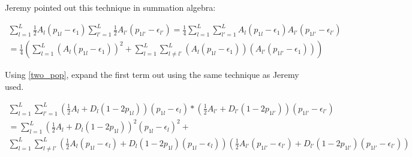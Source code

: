 \documentclass[a4paper,10pt]{article}
\begin{document}
\begin{comment}
    Let's step back from worrying about variances and covariances for
    a minute (I think I was trying to have you solve too many steps at
    once by suggesting to focus on that interpretation). See if you
    can see your way to verifying my intuition about the above
    expressions. The stuff you have written in lines
    \eqref{big-expansion} seems very close to what we're looking for,
    but 1) I think you may be missing some addition signs in between
    the two different sums on each line (but I'm not certain, as I had
    a little trouble following exactly how you arrived at these
    expressions), and 2) I don't totally follow your indexing, as for
    each case you say that $l$ goes from $l'$ to $L$ but at no point
    is it specified what $l'$ is, so that seems like it can't be quite
    right.

  \end{comment}

  Jeremy pointed out this technique in summation algebra: 
  
  \begin{align}
  \sum^L_{l=1}\frac{1}{2}A_l(p_{1l}-\epsilon_{1}) \sum^L_{l'=1}\frac{1}{2}A_{l'}(p_{1l'}-\epsilon_{l'}) =   \frac{1}{4}\sum^L_{l=1}\sum^L_{l'=1}A_l(p_{1l}-\epsilon_{1})A_{l'}(p_{1l'}-\epsilon_{l'}) \\
                                             = \frac{1}{4}\left(\sum^L_{l=1}(A_l(p_{1l}-\epsilon_{1}))^2 + \sum^L_{l=1}\sum^L_{l\neq l'}(A_l(p_{1l}-\epsilon_{1}))(A_{l'}(p_{1l'}-\epsilon_{1}))\right) \label{fst-ld-partition}
  \end{align}

Using \eqref{two_pop}, expand the first term out using the same technique as
Jeremy used.


\begin{equation}
  \begin{split}
    \sum^L_{l=1} \sum^L_{l'=1}(\frac{1}{2}A_l +
    D_l(1-2p_{1l}))(p_{1l}-\epsilon_l) * (\frac{1}{2}A_{l'} +
    D_{l'}(1-2p_{1l'}))(p_{1l'}-\epsilon_{l'}) \\
    =\sum^L_{l=1}(\frac{1}{2}A_l+D_l(1-2p_{1l}))^2(p_{1l}-\epsilon_l)^2+ \\
    \sum^L_{l=1}\sum^L_{l \neq
    l'}(\frac{1}{2}A_l(p_{1l}-\epsilon_l)+D_l(1-2p_{1l})(p_{1l}-\epsilon_l))(\frac{1}{2}A_{l'}(p_{1l'}-\epsilon_{l'})+D_{l'}(1-2p_{1l'})(p_{1l'}-\epsilon_{l'})) \label{second_expansion_penult}
  \end{split}
\end{equation} 
\end{document}
